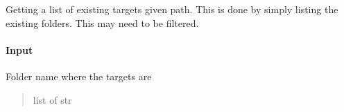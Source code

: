 \documentclass[letterpaper,10pt,english]{sphinxmanual}
\begin{document}
\begin{fulllineitems}
\label{\detokenize{api/pymusepipe:pymusepipe.util_pipe.get_list_targets}}
\pysigstartsignatures
{}
\pysigstopsignatures
\sphinxAtStartPar
Getting a list of existing targets given path. This is done by simply listing the existing
folders. This may need to be filtered.


\paragraph{Input}
\label{\detokenize{api/pymusepipe:id169}}\begin{description}
\sphinxAtStartPar
Folder name where the targets are

\end{description}
\begin{quote}\begin{description}
\sphinxAtStartPar
{}

\sphinxAtStartPar
list of str

\end{description}\end{quote}

\end{fulllineitems}

\end{document}
